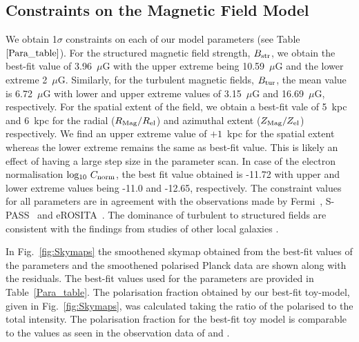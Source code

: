 \documentclass[usenatbib]{mnras}
\begin{document}
\subsection{Constraints on the Magnetic Field Model}
\label{Results}
We obtain 1$\sigma$ constraints on each of our model parameters (see Table~$\ref{Para_table}$). For the structured magnetic field strength, $B_{\rm str}$, we obtain the best-fit value of 3.96~$\mu$G with the upper extreme being 10.59~$\mu$G and the lower extreme 2~$\mu$G. Similarly, for the turbulent magnetic fields, $B_{\rm tur}$, the mean value is 6.72~$\mu$G with lower and upper extreme values of 3.15~$\mu$G and 16.69~$\mu$G, respectively. For the spatial extent of the field, we obtain a best-fit vale of  5~kpc and 6~kpc for the radial ($R_{\rm Mag}/R_{\rm el}$) and azimuthal extent ($Z_{\rm Mag}/Z_{\rm el}$) respectively. We find an upper extreme value of $+ 1$~kpc for the spatial extent whereas the lower extreme remains the same as best-fit value. This is likely an effect of having a large step size in the parameter scan. In case of the electron normalisation ${\rm log_{10}}~ C_{\rm norm}$, the best fit value obtained is -11.72 with upper and lower extreme values being -11.0 and -12.65, respectively. The constraint values for all parameters are in agreement with the observations made by Fermi~\citep{Su_2010}, S-PASS~\citep{Carretti_2013} and eROSITA~\citep{eROSITA}. The dominance of turbulent to structured fields are consistent with the findings from studies of other local galaxies \citep{Beck_NGC_6946,Tabatabaei_2008}.

In Fig.~\ref{fig:Skymaps} the smoothened skymap obtained from the best-fit values of the parameters and the smoothened polarised Planck data are shown along with the residuals. The best-fit values used for the parameters are provided in Table~\ref{Para_table}. 
The polarisation fraction obtained by our best-fit toy-model, given in Fig.~\ref{fig:Skymaps}, was calculated taking the ratio of the polarised to the total intensity. The polarisation fraction for the best-fit toy model is comparable to the values as seen in the observation data of \citet{WMAP_Page} and \citet{Carretti_2013}.

\end{document}
